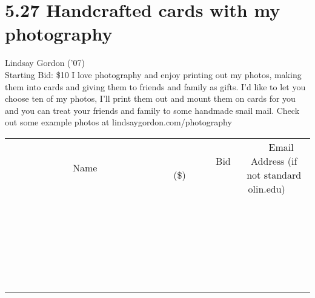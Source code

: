 \documentclass[11pt]{article}
\begin{document}
\section*{5.27 Handcrafted cards with my photography}
Lindsay Gordon ('07)
\\
Starting Bid: \$10
\newline
I love photography and enjoy printing out my photos, making them into cards and giving them to friends and family as gifts. I’d like to let you choose ten of my photos, I’ll print them out and mount them on cards for you and you can treat your friends and family to some handmade snail mail. Check out some example photos at lindsaygordon.com/photography
\\[6ex]
\begin{tabular}{c c c}
~~~~~~~~~~~~~Name~~~~~~~~~~~~~ & ~~~~~~~~~Bid (\$)~~~~~~~~~  & ~~~Email Address (if not standard olin.edu)~~~\\
 & & \\
\hline
 & & \\
\hline
 & & \\
\hline
 & & \\
\hline
 & & \\
\hline
 & & \\
\hline
 & & \\
\hline
 & & \\
\hline
 & & \\
\hline
 & & \\
\hline
 & & \\
\hline
 & & \\
\hline
 & & \\
\hline
 & & \\
\hline
 & & \\
\hline
 & & \\
\hline
 & & \\
\hline
 & & \\
\hline
 & & \\
\hline
 & & \\
\hline
 & & \\
\hline
 & & \\
\hline
 & & \\
\hline
 & & \\
\hline
 & & \\
\hline
 & & \\
\hline
\end{tabular}
\newpage
\end{document}
